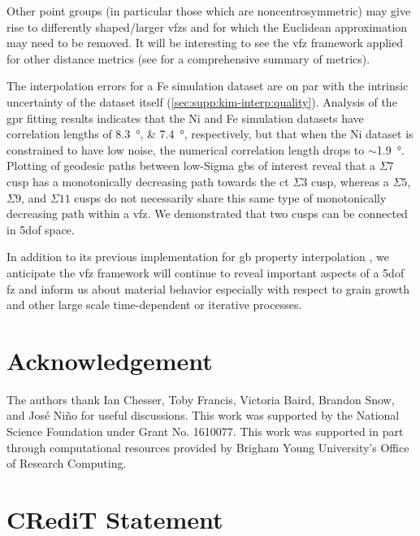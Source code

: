 \documentclass[final,twocolumn,12pt]{elsarticle}
\begin{document}
	Other point groups (in particular those which are noncentrosymmetric) may give rise to differently shaped/larger \glspl{vfz} and for which the Euclidean approximation may need to be removed. It will be interesting to see the \gls{vfz} framework applied for other distance metrics (see \citet{morawiecDistancesGrainInterfaces2019} for a comprehensive summary of metrics).

	The interpolation errors for a Fe simulation dataset are on par with the intrinsic uncertainty of the dataset itself (\cref{sec:supp:kim-interp:quality}). Analysis of the \gls{gpr} fitting results indicates that the Ni and Fe simulation datasets have correlation lengths of \SIlist{8.3;7.4}{\degree}, respectively, but that when the Ni dataset is constrained to have low noise, the numerical correlation length drops to $\sim$\SI{1.9}{\degree}.
	Plotting of geodesic paths between low-Sigma \glspl{gb} of interest reveal that a $\Sigma$7 cusp has a monotonically decreasing path towards the \gls{ct} $\Sigma3$ cusp, whereas a $\Sigma5$, $\Sigma9$, and $\Sigma11$ cusps do not necessarily share this same type of monotonically decreasing path within a \gls{vfz}. We demonstrated that two cusps can be connected in \gls{5dof} space.
	
	In addition to its previous implementation for \gls{gb} property interpolation \cite{bairdFiveDegreeofFreedomPropertyUnderReview}, we anticipate the \gls{vfz} framework will continue to reveal important aspects of a \gls{5dof} \gls{fz} and inform us about material behavior especially with respect to grain growth and other large scale time-dependent or iterative processes.

	\section*{Acknowledgement}
	\label{sec:acknowledgement}
	
	The authors thank Ian Chesser, Toby Francis, Victoria Baird, Brandon Snow, and José Niño for useful discussions. This work was supported by the National Science Foundation under Grant No. 1610077. This work was supported in part through computational resources provided by Brigham Young University's Office of Research Computing.
	\section*{CRediT Statement}
	
	
	
	\begin{appendices}
		
		
	\end{appendices}
	
	\printglossaries
	
	
	
	
	
\end{document}
